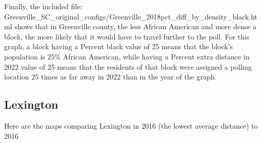 \documentclass[11pt]{article}
\theoremstyle{remark}
\theoremstyle{definition}
\begin{document}
Finally, the included file: \textrm{Greenville\_SC\_original\_configs/Greenville\_2018pct\_diff\_by\_density\_black.html} shows that in Greenville county, the less African American and more dense a block, the more likely that it would have to travel further to the poll. For this graph, a block having a Percent black value of 25 means that the block's population is $25\%$ African American, while having a Percent extra distance in 2022 value of 25 means that the residents of that block were assigned a polling location 25 times as far away in 2022 than in the year of the graph.

\subsection{Lexington}
Here are the maps comparing Lexington in 2016 (the lowest average distance) to 2016
\end{document}

